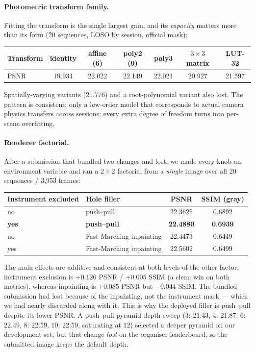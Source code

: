\paragraph{Photometric transform family.} Fitting the transform is the single largest gain, and its
\emph{capacity} matters more than its form (20 sequences, LOSO by session, official mask):

\begin{center}
\begin{tabular}{lcccccc}
\toprule
Transform & identity & affine (6) & poly2 (9) & poly3 & $3{\times}3$ matrix & LUT-32 \\
\midrule
PSNR & 19.934 & 22.022 & 22.149 & 22.021 & 20.927 & 21.597 \\
\bottomrule
\end{tabular}
\end{center}

Spatially-varying variants ($21.776$) and a root-polynomial variant also lost. The pattern is consistent:
only a low-order model that corresponds to actual camera physics transfers across sessions; every extra
degree of freedom turns into per-scene overfitting.

\paragraph{Renderer factorial.} After a submission that bundled two changes and lost, we made every knob
an environment variable and ran a $2\times 2$ factorial from a \emph{single} image over all 20 sequences /
3{,}953 frames:

\begin{center}
\begin{tabular}{llcc}
\toprule
Instrument excluded & Hole filler & PSNR & SSIM (gray) \\
\midrule
no  & push--pull & 22.3625 & 0.6892 \\
\textbf{yes} & \textbf{push--pull} & \textbf{22.4880} & \textbf{0.6939} \\
no  & Fast-Marching inpainting & 22.4473 & 0.6449 \\
yes & Fast-Marching inpainting & 22.5602 & 0.6499 \\
\bottomrule
\end{tabular}
\end{center}

The main effects are additive and consistent at both levels of the other factor: instrument exclusion is
$+0.126$ PSNR / $+0.005$ SSIM (a clean win on both metrics), whereas inpainting is $+0.085$ PSNR but
$-0.044$ SSIM. The bundled submission had lost because of the inpainting, not the instrument mask --- which
we had nearly discarded along with it. This is why the deployed filler is push--pull despite its lower
PSNR. A push--pull pyramid-depth sweep ($3$: 21.43, $4$: 21.87, $6$: 22.49, $8$: 22.59, $10$: 22.59,
saturating at $12$) selected a deeper pyramid on our development set, but that change \emph{lost} on the
organiser leaderboard, so the submitted image keeps the default depth.

